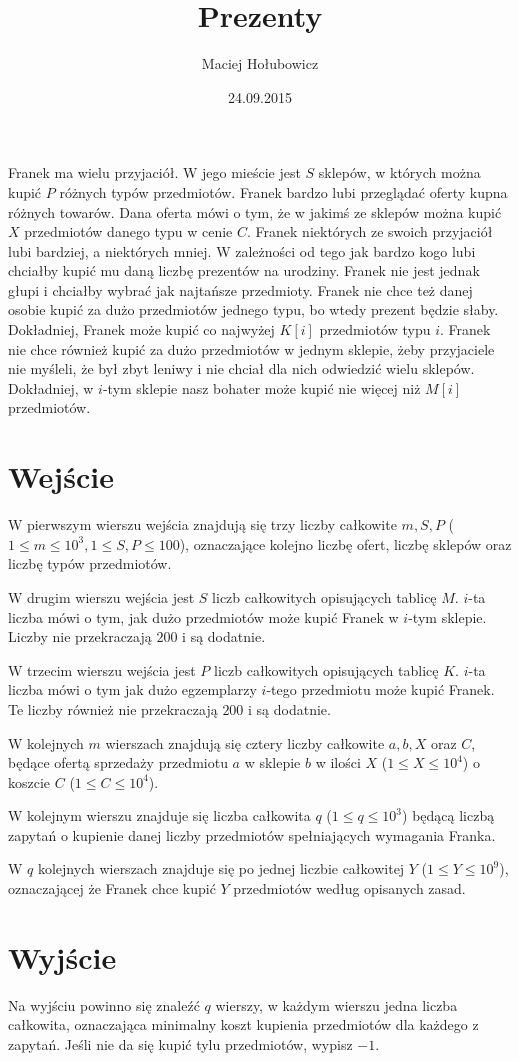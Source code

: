 \documentclass[zad,zawodnik,utf8]{sinol}
\title{Prezenty}
\author{Maciej Hołubowicz} %
\date{24.09.2015}
\begin{document}
\begin{tasktext}%
Franek ma wielu przyjaciół. W jego mieście jest $S$ sklepów, w których można kupić $P$ różnych typów przedmiotów.
Franek bardzo lubi przeglądać oferty kupna różnych towarów. 
Dana oferta mówi o tym, że w jakimś ze sklepów można kupić $X$ przedmiotów danego typu w cenie $C$.
Franek niektórych ze swoich przyjaciół lubi bardziej, a niektórych mniej. 
W zależności od tego jak bardzo kogo lubi chciałby kupić mu daną liczbę prezentów na urodziny.
Franek nie jest jednak głupi i chciałby wybrać jak najtańsze przedmioty.
Franek nie chce też danej osobie kupić za dużo przedmiotów jednego typu, bo wtedy prezent będzie słaby.
Dokładniej, Franek może kupić co najwyżej $K[i]$ przedmiotów typu $i$.
Franek nie chce również kupić za dużo przedmiotów w jednym sklepie, żeby przyjaciele nie myśleli, że był zbyt leniwy i nie chciał dla nich odwiedzić wielu sklepów.
Dokładniej, w $i$-tym sklepie nasz bohater może kupić nie więcej niż $M[i]$ przedmiotów. 


  \section{Wejście}
W pierwszym wierszu wejścia znajdują się trzy liczby całkowite $m, S, P$ ($1 \leq m \leq 10^3, 1 \leq S, P \leq 100$), oznaczające kolejno liczbę ofert, liczbę sklepów oraz liczbę typów przedmiotów.

W drugim wierszu wejścia jest $S$ liczb całkowitych opisujących tablicę $M$. $i$-ta liczba mówi o tym, jak dużo przedmiotów może kupić Franek w $i$-tym sklepie. Liczby nie przekraczają $200$ i są dodatnie.

W trzecim wierszu wejścia jest $P$ liczb całkowitych opisujących tablicę $K$. $i$-ta liczba mówi o tym jak dużo egzemplarzy $i$-tego przedmiotu może kupić Franek. Te liczby również nie przekraczają $200$ i są dodatnie.

W kolejnych $m$ wierszach znajdują się cztery liczby całkowite $a, b, X$ oraz $C$, będące ofertą sprzedaży przedmiotu $a$ w sklepie $b$ w ilości $X$ ($ 1 \leq X \leq 10^4$) o koszcie $C$ ($1 \leq C \leq 10^4$).

W kolejnym wierszu znajduje się liczba całkowita $q$ ($1 \leq q \leq 10^3$) będącą liczbą zapytań o kupienie danej liczby przedmiotów spełniających wymagania Franka.

W $q$ kolejnych wierszach znajduje się po jednej liczbie całkowitej $Y$ ($1 \leq Y \leq 10^9$), oznaczającej że Franek chce kupić $Y$ przedmiotów według opisanych zasad.

  \section{Wyjście}
Na wyjściu powinno się znaleźć $q$ wierszy, w każdym wierszu jedna liczba całkowita, oznaczająca minimalny koszt kupienia przedmiotów dla każdego z zapytań. Jeśli nie da się kupić tylu przedmiotów, wypisz $-1$.

\makecompactexample

\end{tasktext}
\end{document}
